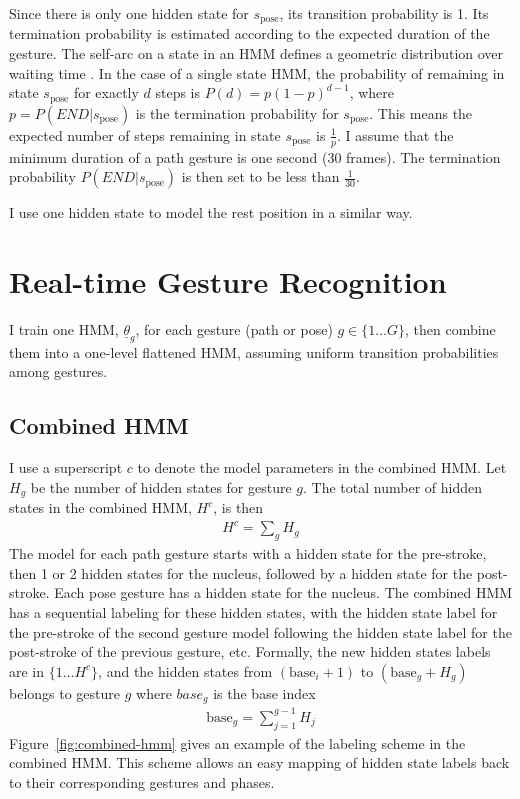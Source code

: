Since there is only one hidden state for $s_{\text{pose}}$, its transition
probability is 1. Its termination probability is estimated according to the
expected duration of the gesture. The self-arc on a state in an HMM defines a 
geometric distribution over waiting time \cite{murphy02}. In the case of a
single state HMM, the probability of remaining in state $s_{\text{pose}}$ for
exactly $d$ steps is $P(d) = p(1-p)^{d - 1}$, where $p = P(END|s_\text{pose})$
is the termination probability for $s_{\text{pose}}$. This means the expected
number of steps remaining in state $s_{\text{pose}}$ is $\frac{1}{p}$. I assume
that the minimum duration of a path gesture is one
second (30 frames). The termination probability $P(END|s_\text{pose})$ is then set to
be less than $\frac{1}{30}$.

I use one hidden state to model the rest position in a similar way.

\section{Real-time Gesture Recognition}
I train one HMM, $\underline{\theta}_g$, for each gesture (path or pose) $g\in
\{1\ldots G\}$, then combine them into a one-level flattened HMM, assuming uniform transition probabilities among gestures.

\subsection{Combined HMM}
I use a superscript $c$ to denote the model
parameters in the combined HMM. Let $H_{g}$ be the number of hidden states for
gesture $g$. The total number of hidden states in the combined HMM, $H^c$, is then
\begin{align*}
H^c = \sum_g H_{g}
\end{align*}
The model for each path gesture starts with a hidden state for the pre-stroke,
then 1 or 2 hidden states for the nucleus, followed by a hidden state for the
post-stroke. Each pose gesture has a hidden state for the nucleus. The combined
HMM has a sequential labeling for these hidden states, with the hidden state label for the pre-stroke of the second gesture model following
the hidden state label for the post-stroke of the previous gesture, etc.
Formally, the new hidden states labels are in $\{1\ldots H^c\}$, and
the hidden states from $(\text{base}_i + 1)$ to $(\text{base}_g + H_{g})$
belongs to gesture $g$ where $base_g$ is the base index
\begin{align*}
\text{base}_g = \sum_{j=1}^{g-1}H_{j}
\end{align*}
Figure~\ref{fig:combined-hmm} gives an example of the labeling scheme in
the combined HMM. This scheme allows an easy mapping of hidden state labels
back to their corresponding gestures and phases.


